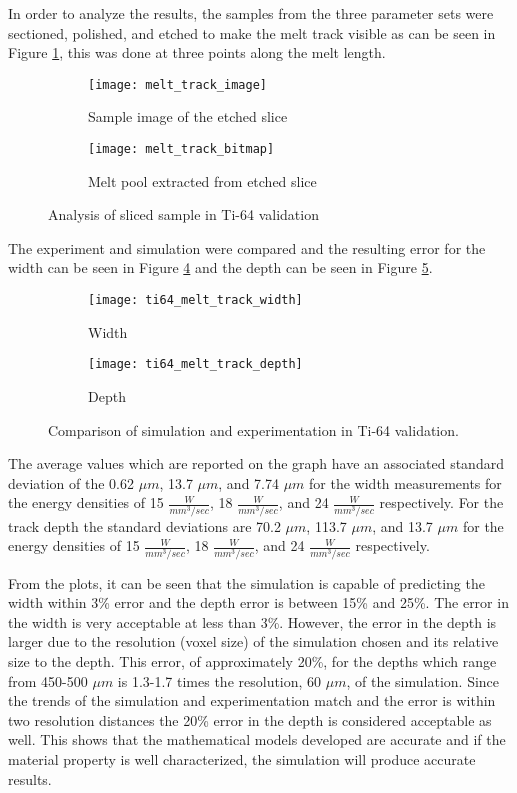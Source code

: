 In order to analyze the results, the samples from the three parameter sets were sectioned, polished, and etched to make the melt track visible as can be seen in Figure \ref{fig:melt_track_image}, this was done at three points along the melt length.  
\begin{figure}[!htb]
	\centering
		\begin{subfigure}{0.495\textwidth}
		\texttt{[image: melt\_track\_image]}
		\caption{Sample image of the etched slice}
		\label{fig:melt_track_image}
		\end{subfigure}
			\begin{subfigure}{0.495\textwidth}
			\texttt{[image: melt\_track\_bitmap]}
			\caption{Melt pool extracted from etched slice}
			\label{fig:melt_track_bitmap}
			\end{subfigure}
	\caption{Analysis of sliced sample in Ti-64 validation}
	\label{fig:melt_track}
\end{figure}
The experiment and simulation were compared and the resulting error for the width can be seen in Figure \ref{fig:ti64_melt_track_width} and the depth can be seen in Figure \ref{fig:ti64_melt_track_depth}.
\begin{figure}[!htb]\centering
	\begin{subfigure}[c]{0.45\textwidth}\centering
	\texttt{[image: ti64\_melt\_track\_width]}
	\caption{Width}
	\label{fig:ti64_melt_track_width}
	\end{subfigure}\hfill{}
		\begin{subfigure}[c]{0.45\textwidth}\centering
		\texttt{[image: ti64\_melt\_track\_depth]}
		\caption{Depth}
		\label{fig:ti64_melt_track_depth}
		\end{subfigure}
	\caption{Comparison of simulation and experimentation in Ti-64 validation.}
	\label{fig:ti64_melt_track}
\end{figure}
The average values which are reported on the graph have an associated standard deviation of the 0.62 $\mu m$, 13.7 $\mu m$, and 7.74 $\mu m$ for the width measurements for the energy densities of 15 $\frac{W}{mm^3/sec}$, 18 $\frac{W}{mm^3/sec}$, and 24 $\frac{W}{mm^3/sec}$ respectively.  For the track depth the standard deviations are 70.2 $\mu m$, 113.7 $\mu m$, and 13.7 $\mu m$ for the energy densities of 15 $\frac{W}{mm^3/sec}$, 18 $\frac{W}{mm^3/sec}$, and 24 $\frac{W}{mm^3/sec}$ respectively.

From the plots, it can be seen that the simulation is capable of predicting the width within 3\% error and the depth error is between 15\% and 25\%.  The error in the width is very acceptable at less than 3\%.
However, the error in the depth is larger due to the resolution (voxel size) of the simulation chosen and its relative size to the depth.  This error, of approximately 20\%, for the depths which range from 450-500 $\mu m$ is 1.3-1.7 times the resolution, 60 $\mu m$, of the simulation.  Since the trends of the simulation and experimentation match and the error is within two resolution distances the 20\% error in the depth is considered acceptable as well. 
This shows that the mathematical models developed are accurate and if the material property is well characterized, the simulation will produce accurate results.

